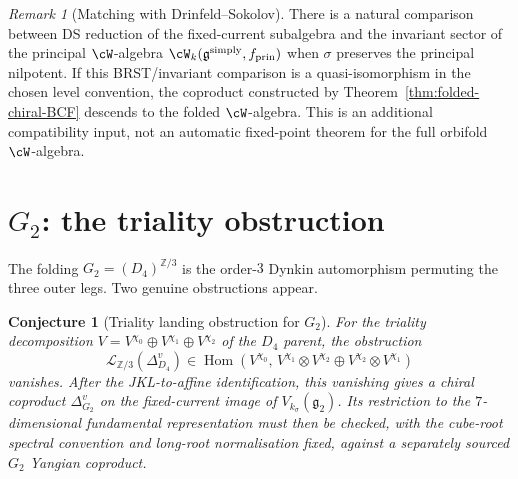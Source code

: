 \documentclass[11pt]{amsart}
\newtheorem{conjecture}[theorem]{Conjecture}
\theoremstyle{definition}
\theoremstyle{remark}
\newtheorem{remark}[theorem]{Remark}
\providecommand{\fg}{\mathfrak{g}}
\begin{document}
\begin{remark}[Matching with Drinfeld--Sokolov]
There is a natural comparison between DS reduction of the fixed-current
subalgebra and the invariant sector of the principal $\cW$-algebra
$\cW_k(\fg^{\mathrm{simply}}, f_{\mathrm{prin}})$ when $\sigma$
preserves the principal nilpotent. If this BRST/invariant comparison is
a quasi-isomorphism in the chosen level convention, the coproduct
constructed by Theorem~\ref{thm:folded-chiral-BCF} descends to the folded
$\cW$-algebra. This is an additional compatibility input, not an
automatic fixed-point theorem for the full orbifold $\cW$-algebra.
\end{remark}

\section{$G_2$: the triality obstruction}
\label{sec:G2-triality}

The folding $G_2 = (D_4)^{\mathbb{Z}/3}$ is the order-$3$ Dynkin
automorphism permuting the three outer legs. Two genuine obstructions
appear.

\begin{conjecture}[Triality landing obstruction for $G_2$]%
\label{conj:G2-folding}%
For the triality decomposition
$V=V^{\chi_0}\oplus V^{\chi_1}\oplus V^{\chi_2}$ of the $D_4$ parent,
the obstruction
\[
  \mathcal L_{\mathbb Z/3}(\Delta^v_{D_4})
  \in
  \operatorname{Hom}\!\left(
    V^{\chi_0},\,
    V^{\chi_1}\otimes V^{\chi_2}
    \oplus
    V^{\chi_2}\otimes V^{\chi_1}
  \right)
\]
vanishes. After the JKL-to-affine identification, this vanishing gives
a chiral coproduct $\Delta^v_{G_2}$ on the fixed-current image of
$V_{k_\sigma}(\fg_2)$. Its restriction to the $7$-dimensional
fundamental representation must then be checked, with the cube-root
spectral convention and long-root normalisation fixed, against a
separately sourced $G_2$ Yangian coproduct.
\end{conjecture}
\end{document}
